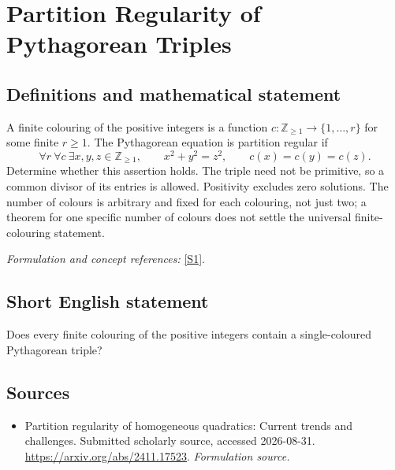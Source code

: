 \documentclass[11pt]{article}
\begin{document}
\section*{\texorpdfstring{Partition Regularity of Pythagorean Triples}{Partition Regularity of Pythagorean Triples}}\label{30003641}
\subsection{Definitions and mathematical statement}
A finite colouring of the positive integers is a function $c:{\mathbb{Z}}_{\ge1}\to\{1,\ldots,r\}$ for some finite $r\ge1$. The Pythagorean equation is partition regular if
\[
 \forall r\ \forall c\ \exists x,y,z\in{\mathbb{Z}}_{\ge1},
 \qquad x^2+y^2=z^2,
 \qquad c(x)=c(y)=c(z).
\]
Determine whether this assertion holds. The triple need not be primitive, so a common divisor of its entries is allowed. Positivity excludes zero solutions. The number of colours is arbitrary and fixed for each colouring, not just two; a theorem for one specific number of colours does not settle the universal finite-colouring statement.
\par\smallskip\textit{Formulation and concept references:} \href{https://arxiv.org/abs/2411.17523}{[S1]}.

\subsection{Short English statement}
Does every finite colouring of the positive integers contain a single-coloured Pythagorean triple?
\subsection{Sources}
\begin{itemize}
\item[S1]Partition regularity of homogeneous quadratics: Current trends and challenges. Submitted scholarly source, accessed 2026-08-31.
\url{https://arxiv.org/abs/2411.17523}.
\textit{Formulation source.}
\end{itemize}
\end{document}
